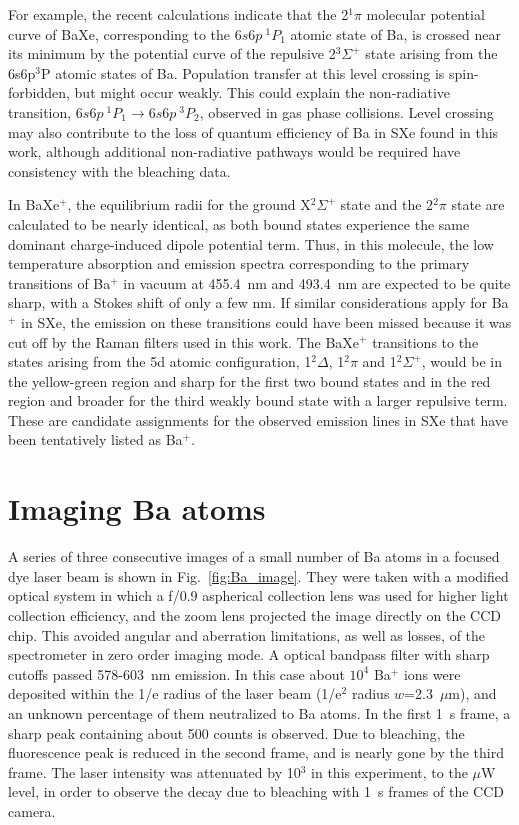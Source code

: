 \documentclass[aps,pra,reprint,superscriptaddress]{revtex4-1}
\begin{document}
For example, the recent calculations indicate that the 2$^1\pi$ molecular potential curve of BaXe, corresponding to the $6s6p~^1P_1$ atomic state of Ba, is crossed near its minimum by the potential curve of the repulsive 2$^3\Sigma^+$ state arising from the 6s6p${^3}$P atomic states of Ba.
Population transfer at this level crossing is spin-forbidden, but might occur weakly.
This could explain the non-radiative transition, $6s6p~^1P_1\rightarrow 6s6p~^3P_2$, observed in gas phase collisions.
Level crossing may also contribute to the loss of quantum efficiency of Ba in SXe found in this work, although additional non-radiative pathways would be required have consistency with the bleaching data.

In BaXe$^+$, the equilibrium radii for the ground X$^2\Sigma^+$ state and the 2$^2\pi$ state are calculated to be nearly identical, as both bound states experience the same dominant charge-induced dipole potential term.
Thus, in this molecule, the low temperature absorption and emission spectra corresponding to the primary transitions of Ba$^+$ in vacuum at 455.4~nm and 493.4~nm are expected to be quite sharp, with a Stokes shift of only a few nm.
If similar considerations apply for Ba$^+$ in SXe, the emission on these transitions could have been missed because it was cut off by the Raman filters used in this work.
The BaXe$^+$ transitions to the states arising from the 5d atomic configuration, 1$^2\Delta$, 1$^2\pi$ and 1$^2\Sigma^+$, would be in the yellow-green region and sharp for the first two bound states and in the red region and broader for the third weakly bound state with a larger repulsive term.
These are candidate assignments for the observed emission lines in SXe that have been tentatively listed as Ba$^+$.

\section{Imaging Ba atoms}

A series of three consecutive images of a small number of Ba atoms in a focused dye laser beam is shown in Fig.~\ref{fig:Ba_image}.
They were taken with a modified optical system in which a f/0.9 aspherical collection lens was used for higher light collection efficiency, and the zoom lens projected the image directly on the CCD chip.
This avoided angular and aberration limitations, as well as losses, of the spectrometer in zero order imaging mode.
A optical bandpass filter with sharp cutoffs passed 578-603~nm emission.
In this case about $10^4$ Ba$^+$ ions were deposited within the 1/e radius of the laser beam (1/e$^2$ radius $w$=2.3~$\mu$m), and an unknown percentage of them neutralized to Ba atoms.
In the first 1~s frame, a sharp peak containing about 500 counts is observed.  
Due to bleaching, the fluorescence peak is reduced in the second frame, and is nearly gone by the third frame.
The laser intensity was attenuated by 10$^3$ in this experiment, to the $\mu$W level, in order to observe the decay due to bleaching with 1~s frames of the CCD camera.
\end{document}
